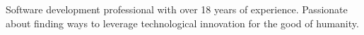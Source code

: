 

\begin{cvparagraph}

\center
{
  Software development professional with over 18 years of experience.\linebreak
  Passionate about finding ways to leverage technological innovation for the good of humanity.
}
\end{cvparagraph}
